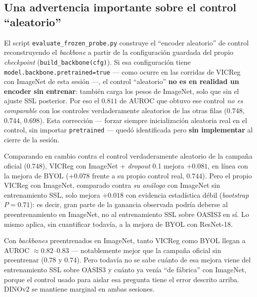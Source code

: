 \documentclass[11pt,a4paper]{article}
\begin{document}
\subsection{Una advertencia importante sobre el control ``aleatorio''}
\label{sec:caveat}

\begin{warnbox}
El script \texttt{evaluate\_frozen\_probe.py} construye el ``encoder
aleatorio'' de control reconstruyendo el \emph{backbone} a partir de la
configuración guardada del propio \emph{checkpoint}
(\texttt{build\_backbone(cfg)}). Si esa configuración tiene
\texttt{model.backbone.pretrained=true} --- como ocurre en las corridas de
VICReg con ImageNet de esta sesión ---, el control ``aleatorio'' \textbf{no
es en realidad un encoder sin entrenar}: también carga los pesos de
ImageNet, solo que sin el ajuste SSL posterior. Por eso el $0.811$ de AUROC
que obtuvo ese control \emph{no es comparable} con los controles
verdaderamente aleatorios de las otras filas ($0.748$, $0.744$, $0.698$).
Esta corrección --- forzar siempre inicialización aleatoria real en el
control, sin importar \texttt{pretrained} --- quedó identificada pero
\textbf{sin implementar} al cierre de la sesión.
\end{warnbox}

Comparando en cambio contra el control verdaderamente aleatorio de la
campaña oficial (0.748), VICReg con ImageNet + \emph{dropout} 0.1 mejora
$+0.081$, en línea con la mejora de BYOL ($+0.078$ frente a su propio
control real, 0.744). Pero el propio VICReg con ImageNet, comparado contra
\emph{su análogo} con ImageNet sin entrenamiento SSL, solo mejora $+0.018$
con evidencia estadística débil (\emph{bootstrap} $P=0.71$): es decir, gran
parte de la ganancia observada podría deberse al preentrenamiento en
ImageNet, no al entrenamiento SSL sobre OASIS3 en sí. Lo mismo aplica, sin
cuantificar todavía, a la mejora de BYOL con ResNet-18.

\begin{tldrbox}
Con \emph{backbones} preentrenados en ImageNet, tanto VICReg como BYOL
llegan a AUROC $\approx0.82$--$0.83$ --- notablemente mejor que la campaña
oficial sin preentrenar ($0.78$ y $0.74$). Pero todavía no se sabe cuánto de
esa mejora viene del entrenamiento SSL sobre OASIS3 y cuánto ya venía
``de fábrica'' con ImageNet, porque el control usado para aislar esa
pregunta tiene el error descrito arriba. DINOv2 se mantiene marginal en
ambas sesiones.
\end{tldrbox}
\end{document}
